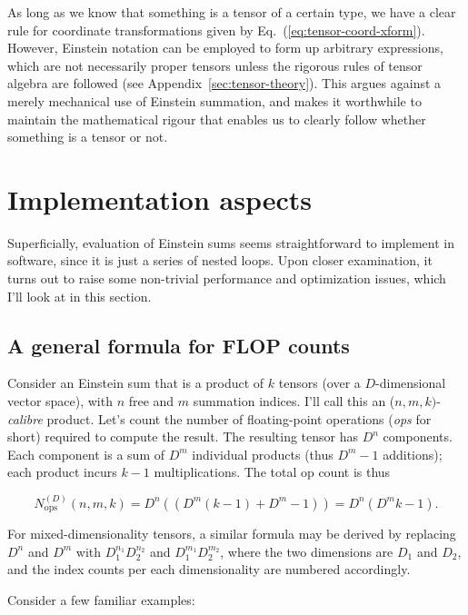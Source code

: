 \documentclass[]{aa}
\begin{document}
As long as we know that something is a tensor of a certain type, we have a clear rule for coordinate transformations given by Eq.~(\ref{eq:tensor-coord-xform}). However, Einstein notation can be employed to form up arbitrary expressions, which are not necessarily proper tensors unless the rigorous rules of tensor algebra are followed (see Appendix~\ref{sec:tensor-theory}). This argues against a merely mechanical use of Einstein summation, and makes it worthwhile to maintain the mathematical rigour that enables us to clearly follow whether something is a tensor or not.

\section{Implementation aspects}

Superficially, evaluation of Einstein sums seems straightforward to implement in software, since it is just a series of nested loops.
Upon closer examination, it turns out to raise some non-trivial performance and optimization issues, which I'll look at in this section.

\subsection{A general formula for FLOP counts}

Consider an Einstein sum that is a product of $k$ tensors (over a $D$-dimensional vector space), with $n$ free and $m$ summation indices. I'll call this an ($n,m,k)$-\emph{calibre\/} product. Let's count the number of floating-point operations (\emph{ops\/} for short) required to compute the result. The resulting tensor has $D^n$ components. Each component is a sum of $D^m$ individual products (thus $D^m-1$ additions); each product incurs $k-1$ multiplications. The total op count is thus 

\begin{equation}
N_\mathrm{ops}^{(D)}(n,m,k) = D^n((D^m(k-1)+D^m-1)) = D^n(D^m k -1 ).
\end{equation}

For mixed-dimensionality tensors, a similar formula may be derived by replacing $D^n$ and $D^m$ with $D_1^{n_1}D_2^{n_2}$ and $D_1^{m_1}D_2^{m_2}$, where the two dimensions are $D_1$ and $D_2$, and the index counts per each dimensionality are numbered accordingly.

Consider a few familiar examples:
\end{document}

